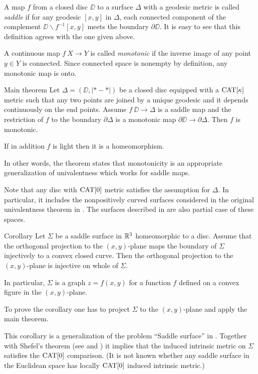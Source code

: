\documentclass{article}
\begin{document}
A map $f$ from a closed disc $\DD$ to a surface $\Delta$ with a geodesic metric is called \emph{saddle} 
if for any geodesic $[x,y]$ in $\Delta$, each connected component of the complement $\DD\backslash f^{-1}[x,y]$ meets the boundary $\partial\DD$.
It is easy to see that this definition agrees with the one given above.

A continuous map $f\:X\to Y$ is called \emph{monotonic} if the inverse image of any point $y\in Y$ is connected.
Since connected space is nonempty by definition, any monotonic map is onto.

\begin{thm}{Main theorem}\label{thm:main}
Let $\Delta=(\DD,|{*}-{*}|)$ be a closed disc equipped with a $\mathop{\rm CAT}\nolimits[\kappa]$ metric 
such that any two points are joined by a unique geodesic and it depends continuously on the end points.
Assume $f\:\DD\to \Delta$ is a saddle map and the restriction of $f$ to the boundary $\partial\Delta$ is a monotonic map 
$\partial\DD\to  \partial\Delta$.
Then $f$ is monotonic. 

If in addition $f$ is light then it is a homeomorphism.
\end{thm}

In other words, the theorem states that monotonicity is an appropriate generalization of univalentness which works for saddle maps.

Note that any disc with $\mathop{\rm CAT}\nolimits[0]$ metric satisfies the assumption for $\Delta$.
In particular, it includes the nonpositively curved surfaces considered in the original univalentness theorem in \cite{schoen-yau}.
The surfaces described in \cite{jost} are also partial case of these spaces.

\begin{thm}{Corollary}
Let $\Sigma$ be a saddle surface in $\mathbb{R}^3$ homeomorphic to a disc.
Assume that the orthogonal projection to the $(x,y)$-plane
maps the boundary of $\Sigma$
injectively to a convex closed curve.
Then the orthogonal projection to the $(x,y)$-plane is injective on whole of $\Sigma$.

In particular, $\Sigma$ is a graph $z=f(x,y)$ for a function $f$ defined on a convex figure in the $(x,y)$-plane.
\end{thm}

To prove the corollary one has to project $\Sigma$ to the $(x,y)$-plane and apply the main theorem.

This corollary is a generalization of the problem ``Saddle surface'' in \cite{petrunin-orthodox}.
Together with Shefel's theorem (see \cite{shefel-3D} and \cite[4.5.5]{akp}) it implies that the induced 
intrinsic metric on $\Sigma$ satisfies the $\mathop{\rm CAT}\nolimits[0]$ comparison. 
(It is not known whether any saddle surface in the Euclidean space has locally $\mathop{\rm CAT}\nolimits[0]$ induced intrinsic metric.)
\end{document}
